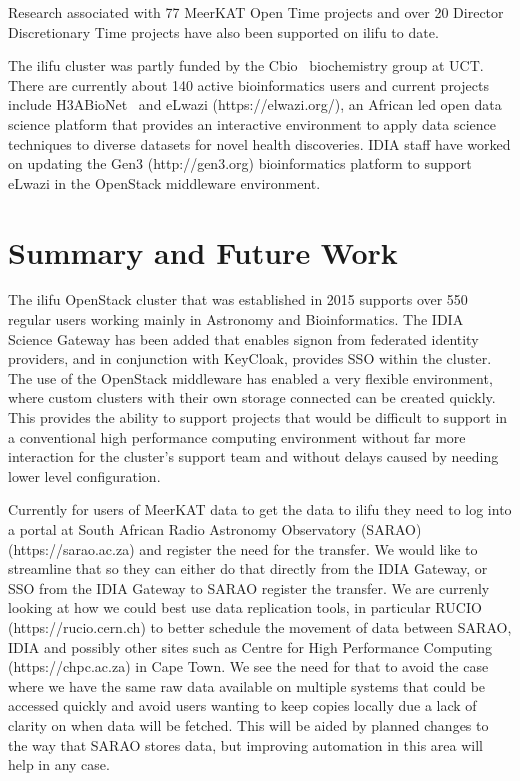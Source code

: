 \documentclass{iau_FM}
\begin{document}
Research associated with 
77 MeerKAT Open Time projects and over 20 Director Discretionary Time projects have also been supported
on ilifu to date.


The ilifu cluster was partly funded by the Cbio~\cite{cbio}
biochemistry group at UCT.
There are currently about 140 active bioinformatics users and 
current projects include H3ABioNet~\cite{H3ABioNet}
and eLwazi (https://elwazi.org/),
an African led open data science platform that provides an interactive environment 
to apply data science techniques to 
diverse datasets for novel health discoveries.
IDIA staff have worked on updating the Gen3 (http://gen3.org) bioinformatics platform 
to support eLwazi in the OpenStack
middleware environment.


\section{Summary and Future Work}
\label{sec:conclusions}


The ilifu OpenStack cluster that was established in 2015 supports over 550 regular users working mainly in Astronomy
and Bioinformatics. The IDIA Science Gateway has been added that enables signon from federated identity providers, and 
in conjunction with KeyCloak, provides SSO within the cluster. The use of the OpenStack middleware
has enabled a very flexible environment, where custom clusters with their own storage connected can be
created quickly. This provides the ability to support projects that would be difficult to support in
a conventional high performance computing environment without far more interaction for the cluster's
support team and without delays caused by needing lower level configuration.

Currently for users of MeerKAT data to get the data to ilifu they need to log into a portal at
South African Radio Astronomy Observatory (SARAO) (https://sarao.ac.za)
and register the need for the transfer. We would like to streamline that so
they can either do that directly from the IDIA Gateway, or SSO from the IDIA Gateway
to SARAO register the transfer. We are currenly looking at how we could best use data replication tools, 
in particular
RUCIO (https://rucio.cern.ch) to better schedule the movement of data between SARAO, 
IDIA and possibly other sites such 
as Centre for High Performance Computing (https://chpc.ac.za) in Cape Town. 
We see the need for that to avoid the case where 
we have the same raw data available
on multiple systems that could be accessed quickly and avoid users wanting to keep copies locally
due a lack of clarity on when data will be fetched. This will be aided by planned changes to the
way that SARAO stores data, but improving automation in this area will help in any case.
\end{document}
